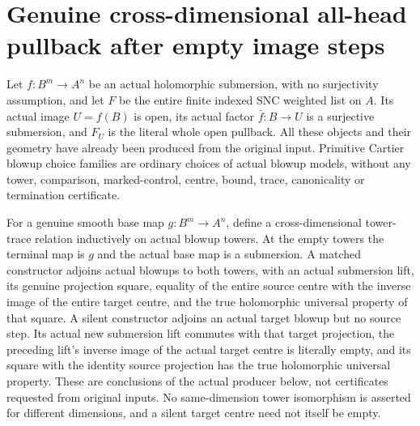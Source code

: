 \section{Genuine cross-dimensional all-head pullback after empty image steps}
Let $f:B^m\to A^n$ be an actual holomorphic submersion, with no surjectivity assumption, and let $F$ be the entire finite indexed SNC weighted list on $A$. Its actual image $U=f(B)$ is open, its actual factor $\bar f:B\to U$ is a surjective submersion, and $F_U$ is the literal whole open pullback. All these objects and their geometry have already been produced from the original input. Primitive Cartier blowup choice families are ordinary choices of actual blowup models, without any tower, comparison, marked-control, centre, bound, trace, canonicality or termination certificate.

\begin{definition}
\label{hir:submersion-compressed-image-trace-definition}
\leanok
{}

For a genuine smooth base map $g:B^m\to A^n$, define a cross-dimensional tower-trace relation inductively on actual blowup towers. At the empty towers the terminal map is $g$ and the actual base map is a submersion. A matched constructor adjoins actual blowups to both towers, with an actual submersion lift, its genuine projection square, equality of the entire source centre with the inverse image of the entire target centre, and the true holomorphic universal property of that square. A silent constructor adjoins an actual target blowup but no source step. Its actual new submersion lift commutes with that target projection, the preceding lift's inverse image of the actual target centre is literally empty, and its square with the identity source projection has the true holomorphic universal property. These are conclusions of the actual producer below, not certificates requested from original inputs. No same-dimension tower isomorphism is asserted for different dimensions, and a silent target centre need not itself be empty.
\end{definition}

